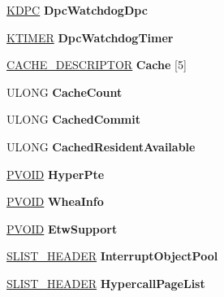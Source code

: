 \begin{DoxyCompactItemize}
\hyperlink{struct___k_d_p_c}{K\+D\+PC} {\bfseries Dpc\+Watchdog\+Dpc}
\item 
\mbox{\label{struct___k_p_r_c_b_af0e27a50bd0f5ab9e4805214c69080fa}} 
\hyperlink{struct___k_t_i_m_e_r}{K\+T\+I\+M\+ER} {\bfseries Dpc\+Watchdog\+Timer}
\item 
\mbox{\label{struct___k_p_r_c_b_a5a99f96fe5ac1b19eec194bfe6574409}} 
\hyperlink{struct___c_a_c_h_e___d_e_s_c_r_i_p_t_o_r}{C\+A\+C\+H\+E\+\_\+\+D\+E\+S\+C\+R\+I\+P\+T\+OR} {\bfseries Cache} \mbox{[}5\mbox{]}
\item 
\mbox{\label{struct___k_p_r_c_b_a1cb330b689be2b30d08f5eea29df8b2d}} 
U\+L\+O\+NG {\bfseries Cache\+Count}
\item 
\mbox{\label{struct___k_p_r_c_b_a550ccd74899a740b051dbc7e258c8034}} 
U\+L\+O\+NG {\bfseries Cached\+Commit}
\item 
\mbox{\label{struct___k_p_r_c_b_a58c9560a2ef6e840c874f1d982ea3220}} 
U\+L\+O\+NG {\bfseries Cached\+Resident\+Available}
\item 
\mbox{\label{struct___k_p_r_c_b_a0c3f08b7014aec83b95acd483d93b369}} 
\hyperlink{interfacevoid}{P\+V\+O\+ID} {\bfseries Hyper\+Pte}
\item 
\mbox{\label{struct___k_p_r_c_b_a3762ae183734c3e533ae60e8e825b547}} 
\hyperlink{interfacevoid}{P\+V\+O\+ID} {\bfseries Whea\+Info}
\item 
\mbox{\label{struct___k_p_r_c_b_a4cdb71e435490fe51c89b46ad70b9ad0}} 
\hyperlink{interfacevoid}{P\+V\+O\+ID} {\bfseries Etw\+Support}
\item 
\mbox{\label{struct___k_p_r_c_b_aff824537d165bede8ee430603d365966}} 
\hyperlink{union___s_l_i_s_t___h_e_a_d_e_r}{S\+L\+I\+S\+T\+\_\+\+H\+E\+A\+D\+ER} {\bfseries Interrupt\+Object\+Pool}
\item 
\mbox{\label{struct___k_p_r_c_b_ab419285b9154c8acbc7d7aa37d6f046d}} 
\hyperlink{union___s_l_i_s_t___h_e_a_d_e_r}{S\+L\+I\+S\+T\+\_\+\+H\+E\+A\+D\+ER} {\bfseries Hypercall\+Page\+List}

\end{DoxyCompactItemize}
